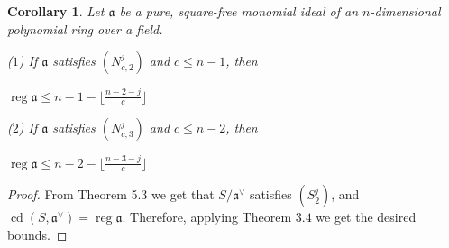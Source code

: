 \documentclass[11pt]{amsart}
\numberwithin{equation}{section}
\newtheorem{cor}[theorem]{Corollary}
\theoremstyle{definition}
\theoremstyle{remark}
\newcommand{\cd}{\operatorname{cd}}
\newcommand{\reg}{\operatorname{reg}}
\begin{document}
\iffalse

We are able to get some quick corollaries from this result.

\begin{cor}
Let $R=S/I$ be an equidimensional Stanley-Reisner ring. The following are equivalent:
\begin{enumerate}[(i)]
\item $R$ satisfies $(S_{2}^j)$.
\item The first syzygy matrix of $I^\vee$ has entries with degree at most $j+1$
\end{enumerate}
\end{cor}

\begin{cor}
Let $R=S/I$ be a pure Stanley-Reisner ring satisfying $(S_\ell^j)$, $\ell < \dim R$. The following are equivalent:
\begin{enumerate}[(i)]
\item $R$ satisfies $(S_{\ell +1}^{j+k})$ and $R$ does not satisfy $(S_{\ell +1}^{j+k-1})$
\item The $\ell^{th}$ syzygy matrix of $I^\vee$ has degree $k+1$
\end{enumerate}
\end{cor}
\fi

\begin{cor}
Let $\mathfrak{a}$ be a pure, square-free monomial ideal of an $n$-dimensional polynomial ring over a field.

($1$) If $\mathfrak{a}$ satisfies $(N_{c,2}^j)$ and $c \leq n-1$, then

\begin{center}
$\reg \mathfrak{a} \leq n-1-\lfloor \frac{n-2-j}{c} \rfloor$
\end{center}

($2$) If $\mathfrak{a}$ satisfies $(N_{c,3}^j)$ and $c \leq n-2$, then
\begin{center}
$\reg \mathfrak{a} \leq n-2-\lfloor \frac{n-3-j}{c} \rfloor$
\end{center}

\end{cor}

\begin{proof}

From Theorem 5.3 we get that $S/\mathfrak{a}^\vee$ satisfies $(S^j_2)$, and $\cd (S,\mathfrak{a}^\vee) = \reg \mathfrak{a}$. Therefore, applying Theorem $3.4$ we get the desired bounds.
\end{proof}
\end{document}
